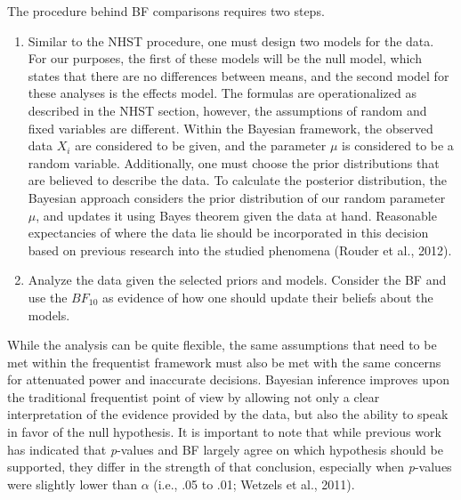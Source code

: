 \documentclass[,man, mask]{apa6}
\begin{document}
The procedure behind BF comparisons requires two steps.

\begin{enumerate}
\def\labelenumi{\arabic{enumi})}
\item
  Similar to the NHST procedure, one must design two models for the data. For our purposes, the first of these models will be the null model, which states that there are no differences between means, and the second model for these analyses is the effects model. The formulas are operationalized as described in the NHST section, however, the assumptions of random and fixed variables are different. Within the Bayesian framework, the observed data \(X_{i}\) are considered to be given, and the parameter \(\mu\) is considered to be a random variable. Additionally, one must choose the prior distributions that are believed to describe the data. To calculate the posterior distribution, the Bayesian approach considers the prior distribution of our random parameter \(\mu\), and updates it using Bayes theorem given the data at hand. Reasonable expectancies of where the data lie should be incorporated in this decision based on previous research into the studied phenomena (Rouder et al., 2012).
\item
  Analyze the data given the selected priors and models. Consider the BF and use the \(BF_{10}\) as evidence of how one should update their beliefs about the models.
\end{enumerate}

While the analysis can be quite flexible, the same assumptions that need to be met within the frequentist framework must also be met with the same concerns for attenuated power and inaccurate decisions. Bayesian inference improves upon the traditional frequentist point of view by allowing not only a clear interpretation of the evidence provided by the data, but also the ability to speak in favor of the null hypothesis. It is important to note that while previous work has indicated that \emph{p}-values and BF largely agree on which hypothesis should be supported, they differ in the strength of that conclusion, especially when \emph{p}-values were slightly lower than \(\alpha\) (i.e., .05 to .01; Wetzels et al., 2011).
\end{document}
